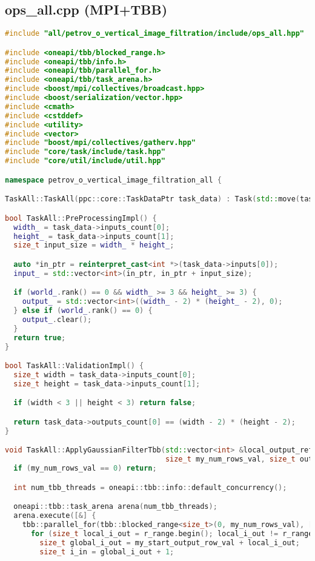 \documentclass[12pt,a4paper]{extarticle}
\begin{document}
\subsection{ops\_all.cpp (MPI+TBB)}
\begin{lstlisting}[language=C++]
#include "all/petrov_o_vertical_image_filtration/include/ops_all.hpp"

#include <oneapi/tbb/blocked_range.h>
#include <oneapi/tbb/info.h>
#include <oneapi/tbb/parallel_for.h>
#include <oneapi/tbb/task_arena.h>
#include <boost/mpi/collectives/broadcast.hpp>
#include <boost/serialization/vector.hpp>
#include <cmath>
#include <cstddef>
#include <utility>
#include <vector>
#include "boost/mpi/collectives/gatherv.hpp"
#include "core/task/include/task.hpp"
#include "core/util/include/util.hpp"

namespace petrov_o_vertical_image_filtration_all {

TaskAll::TaskAll(ppc::core::TaskDataPtr task_data) : Task(std::move(task_data)) {}

bool TaskAll::PreProcessingImpl() {
  width_ = task_data->inputs_count[0];
  height_ = task_data->inputs_count[1];
  size_t input_size = width_ * height_;

  auto *in_ptr = reinterpret_cast<int *>(task_data->inputs[0]);
  input_ = std::vector<int>(in_ptr, in_ptr + input_size);

  if (world_.rank() == 0 && width_ >= 3 && height_ >= 3) {
    output_ = std::vector<int>((width_ - 2) * (height_ - 2), 0);
  } else if (world_.rank() == 0) {
    output_.clear();
  }
  return true;
}

bool TaskAll::ValidationImpl() {
  size_t width = task_data->inputs_count[0];
  size_t height = task_data->inputs_count[1];

  if (width < 3 || height < 3) return false;

  return task_data->outputs_count[0] == (width - 2) * (height - 2);
}

void TaskAll::ApplyGaussianFilterTbb(std::vector<int> &local_output_ref, size_t my_start_output_row_val,
                                     size_t my_num_rows_val, size_t output_cols_val) {
  if (my_num_rows_val == 0) return;

  int num_tbb_threads = oneapi::tbb::info::default_concurrency();

  oneapi::tbb::task_arena arena(num_tbb_threads);
  arena.execute([&] {
    tbb::parallel_for(tbb::blocked_range<size_t>(0, my_num_rows_val), [&](const tbb::blocked_range<size_t> &r_range) {
      for (size_t local_i_out = r_range.begin(); local_i_out != r_range.end(); ++local_i_out) {
        size_t global_i_out = my_start_output_row_val + local_i_out;
        size_t i_in = global_i_out + 1;


\end{lstlisting}
\end{document}
